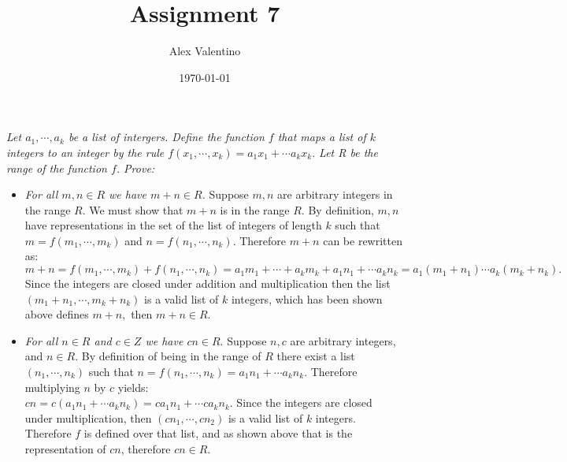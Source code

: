 \documentclass[12pt, letterpaper]{article}
\date{\today}
\author{Alex Valentino}
\title{Assignment 7}
\begin{document}
	\textit{Let $a_1,\cdots,a_k$ be a list of intergers.  Define the function $f$ that maps a list of $k$ integers to an integer by the rule $f(x_1,\cdots,x_k) = a_1 x_1 + \cdots a_k x_k.$  Let R be the range of the function $f$. Prove:}
	\begin{itemize}
		\item \textit{For all $m,n \in R$ we have $m + n \in R$.}
		Suppose $m,n$ are arbitrary integers in the range $R$.  We must show that $m+n$ is in the range $R$.  By definition, $m,n$ have representations in the set of the list of integers of length $k$ such that $m = f(m_1,\cdots, m_k)$ and $n = f(n_1,\cdots,n_k).$  Therefore $m+n$ can be rewritten as:\\
		$m+n = f(m_1,\cdots,m_k) + f(n_1,\cdots,n_k) = a_1 m_1 + \cdots + a_k m_k + a_1 n_1 + \cdots a_k n_k = a_1 ( m_1 + n_1) \cdots a_k (m_k+n_k).$\\
		Since the integers are closed under addition and multiplication then the list $(m_1+n_1, \cdots, m_k +n_k )$ is a valid list of $k$ integers, which has been shown above defines $m+n,$ then $m+n \in R.$
		\item \textit{For all $n \in R$ and $c \in Z$ we have $cn \in R.$ }  Suppose $n,c$ are arbitrary integers, and $n \in R.$  By definition of being in the range of $R$ there exist a list $(n_1,\cdots, n_k)$ such that $n = f(n_1,\cdots,n_k) = a_1 n_1 + \cdots a_k n_k.$ Therefore multiplying $n$ by $c$ yields:\\
		$cn = c(a_1 n_1 + \cdots a_k n_k) = c a_1 n_1 + \cdots c a_k n_k.$  Since the integers are closed under multiplication, then $(cn_1,\cdots,cn_2)$ is a valid list of $k$ integers.  Therefore $f$ is defined over that list, and as shown above that is the representation of $cn$, therefore $cn \in R.$
	\end{itemize}
\end{document}
